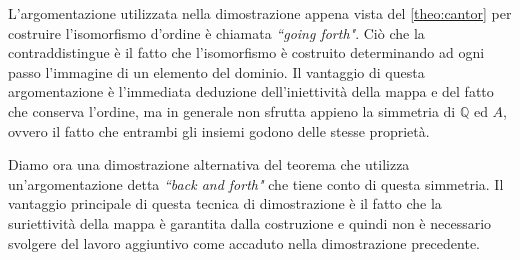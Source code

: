 \documentclass[12pt,a4paper,openright]{report}
\newcommand{\Q}{\mathbb{Q}} %
\newcommand{\0}{\setminus\{0\}} %
\theoremstyle{definition}
\theoremstyle{plain}
\begin{document}
L'argomentazione utilizzata nella dimostrazione appena vista del \cref{theo:cantor} per costruire l'isomorfismo d'ordine è chiamata \emph{``going forth"}. Ciò che la contraddistingue è il fatto che l'isomorfismo è costruito determinando ad ogni passo l'immagine di un elemento del dominio. 
Il vantaggio di questa argomentazione è l'immediata deduzione dell'iniettività della mappa e del fatto che conserva l'ordine, ma in generale non sfrutta appieno la simmetria di $\Q$ ed $A$, ovvero il fatto che entrambi gli insiemi godono delle stesse proprietà.

Diamo ora una dimostrazione alternativa del teorema che utilizza un'argomentazione detta \emph{``back and forth"} che tiene conto di questa simmetria. Il vantaggio principale di questa tecnica di dimostrazione è il fatto che la suriettività della mappa è garantita dalla costruzione e quindi non è necessario svolgere del lavoro aggiuntivo come accaduto nella dimostrazione precedente.
\end{document}
